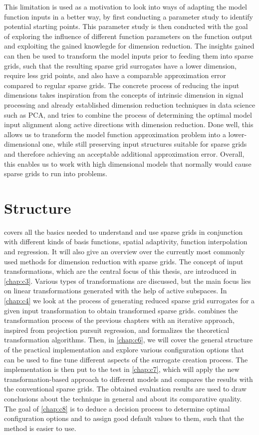 \documentclass[
  a4paper,  %
  twoside,  %
  bibliography=totoc,
  headsepline,
  cleardoublepage=empty,
  parskip=half,
  draft=false
]{scrbook}
\begin{document}
This limitation is used as a motivation to look into ways of adapting the model function inputs in a better way, by first conducting a parameter study to identify potential starting points.
This parameter study is then conducted with the goal of exploring the influence of different function parameters on the function output and exploiting the gained knowlegde for dimension reduction.
The insights gained can then be used to transform the model inputs prior to feeding them into sparse grids, such that the resulting sparse grid surrogates have a lower dimension, require less grid points, and also have a comparable approximation error compared to regular sparse grids.
The concrete process of reducing the input dimensions takes inspiration from the concepts of intrinsic dimension in signal processing and already established dimension reduction techniques in data science such as PCA, and tries to combine the process of determining the optimal model input alignment along active directions with dimension reduction.
Done well, this allows us to transform the model function approximation problem into a lower-dimensional one, while still preserving input structures suitable for sparse grids and therefore achieving an acceptable additional approximation error.
Overall, this enables us to work with high dimensional models that normally would cause sparse grids to run into problems.

\section{Structure}

 covers all the basics needed to understand and use sparse grids in conjunction with different kinds of basis functions, spatial adaptivity, function interpolation and regression.
It will also give an overview over the currently most commonly used methods for dimension reduction with sparse grids.
The concept of input transformations, which are the central focus of this thesis, are introduced in \cref{chap:c3}.
Various types of transformations are discussed, but the main focus lies on linear transformations generated with the help of active subspaces.
In \cref{chap:c4} we look at the process of generating reduced sparse grid surrogates for a given input transformation to obtain transformed sparse grids.
 combines the transformation process of the previous chapters with an iterative approach, inspired from projection pursuit regression, and formalizes the theoretical transformation algorithms.
Then, in \cref{chap:c6}, we will cover the general structure of the practical implementation and explore various configuration options that can be used to fine tune different aspects of the surrogate creation process.
The implementation is then put to the test in \cref{chap:c7}, which will apply the new transformation-based approach to different models and compares the results with the conventional sparse grids.
The obtained evaluation results are used to draw conclusions about the technique in general and about its comparative quality.
The goal of \cref{chap:c8} is to deduce a decision process to determine optimal configuration options and to assign good default values to them, such that the method is easier to use.
\end{document}
